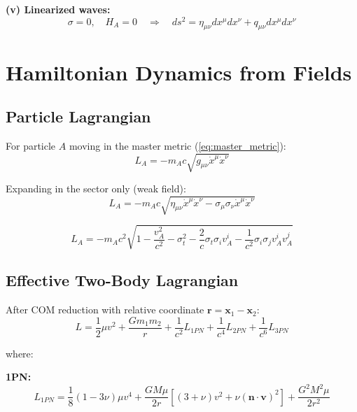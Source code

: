 \documentclass[11pt,a4paper]{article}
\theoremstyle{definition}
\theoremstyle{remark}
\begin{document}
	\textbf{(v) Linearized waves:}
	\begin{equation}
		\sigma=0, \quad H_A=0 \quad \Rightarrow \quad ds^2 = \eta_{\mu\nu}dx^\mu dx^\nu + q_{\mu\nu}dx^\mu dx^\nu
	\end{equation}
	
	\section{Hamiltonian Dynamics from Fields}
	
	\subsection{Particle Lagrangian}
	
	For particle $A$ moving in the master metric (\ref{eq:master_metric}):
	\begin{equation}\label{eq:lagrangian_particle}
		L_A = -m_A c\sqrt{g_{\mu\nu}\dot{x}^\mu\dot{x}^\nu}
	\end{equation}
	
	Expanding in the sector only (weak field):
	\begin{equation}
		L_A = -m_A c\sqrt{\eta_{\mu\nu}\dot{x}^\mu\dot{x}^\nu - \sigma_\mu\sigma_\nu\dot{x}^\mu\dot{x}^\nu}
	\end{equation}
	
	\begin{equation}
		L_A = -m_A c^2\sqrt{1 - \frac{v_A^2}{c^2} - \sigma_t^2 - \frac{2}{c}\sigma_t\sigma_i v_A^i - \frac{1}{c^2}\sigma_i\sigma_j v_A^i v_A^j}
	\end{equation}
	
	\subsection{Effective Two-Body Lagrangian}
	
	After COM reduction with relative coordinate $\mathbf{r} = \mathbf{x}_1 - \mathbf{x}_2$:
	\begin{equation}\label{eq:lagrangian_2body}
		L = \frac{1}{2}\mu v^2 + \frac{Gm_1 m_2}{r} + \frac{1}{c^2}L_{1PN} + \frac{1}{c^4}L_{2PN} + \frac{1}{c^6}L_{3PN}
	\end{equation}
	
	where:
	
	\textbf{1PN:}
	\begin{equation}\label{eq:L_1pn}
		\boxed{L_{1PN} = \frac{1}{8}(1-3\nu)\mu v^4 + \frac{GM\mu}{2r}\left[(3+\nu)v^2 + \nu(\mathbf{n}\cdot\mathbf{v})^2\right] + \frac{G^2M^2\mu}{2r^2}}
	\end{equation}
	
\end{document}
